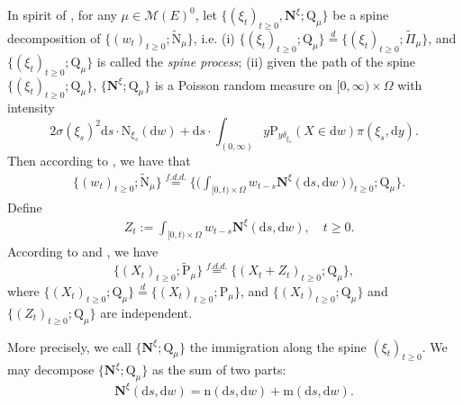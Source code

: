 \documentclass[12pt,a4paper]{amsart}
\numberwithin{equation}{section}
\theoremstyle{plain}
\theoremstyle{definition}
\theoremstyle{remark}
\begin{document}
In spirit of \cite{RenSongSun2020Spine}, for any $\mu\in \mathcal M(E)^0$, let
$\{(\xi_t)_{t\geq 0}, \mathbf N^\xi; \mathrm Q_\mu\}$ be a spine decomposition of $\{(w_t)_{t\geq 0}; \widetilde {\mathrm N}_\mu\}$, i.e.
(i) $\{(\xi_t)_{t\geq 0}; \mathrm Q_\mu\} \overset{d}= \{(\xi_t)_{t\geq 0}; \widetilde \Pi_{\mu} \}$, and $\{(\xi_t)_{t\geq 0}; \mathrm Q_\mu\}$ is called the {\it spine process};
(ii) given the path of the spine
$\{(\xi_t)_{t\geq 0}; \mathrm Q_\mu\}$,
$\{\mathbf N^\xi; \mathrm Q_\mu\}$ is a Poisson random measure on $[0,\infty) \times \Omega$ with intensity
$$
2 \sigma(\xi_s)^2 \mathrm ds \cdot \mathrm N_{\xi_s}(\mathrm dw)+ \mathrm ds \cdot \int_{(0,\infty)} y \mathrm P_{y\delta_{\xi_s}}(X\in \mathrm dw) \pi(\xi_s, \mathrm dy).
$$
Then according to \cite{RenSongSun2020Spine}, we have that
\begin{align}
	& \{(w_t)_{t\geq 0}; \widetilde{\mathrm N}_\mu \} \overset{{f.d.d.}} = \Big\{ \Big( \int_{[0,t)\times \Omega} w_{t-s} \mathbf N^\xi(\mathrm ds, \mathrm dw) \Big)_{t\geq 0} ; \mathrm Q_\mu\Big\}.
\end{align}
Define\begin{align}
	& Z_t:= \int_{[0,t)\times \Omega} w_{t-s} \mathbf N^\xi(\mathrm ds, \mathrm dw), \quad t\geq 0.
\end{align}
According to \cite{RenSongSun2020Spine} and \cite{RenSongYang2016Spine},  we have
\begin{equation}\label{spine-decom1}
	\{(X_t)_{t\geq 0}; \widetilde {\mathrm P}_\mu\} \overset{f.d.d.} = \{ (X_t+ Z_t)_{t\geq 0}; \mathrm Q_\mu\},
\end{equation}
where  $\{(X_t)_{t\geq 0}; \mathrm Q_\mu\} \overset{d} =  \{(X_t)_{t\geq 0}; \mathrm P_\mu\}$,   and $\{(X_t)_{t\geq 0}; \mathrm Q_\mu\} $ and $\{(Z_t)_{t\geq 0}; \mathrm Q_\mu\}$ are independent.

More precisely,
we call $\{\mathbf N^\xi; \mathrm Q_\mu\}$ the immigration along the spine $(\xi_t)_{t\geq 0}$. We may decompose $\{\mathbf N^\xi; \mathrm Q_\mu\}$ as the sum of two parts:
$$
\mathbf N^\xi(\mathrm ds, \mathrm dw)=\mathrm n(\mathrm ds, \mathrm dw)+\mathrm m(\mathrm ds, \mathrm dw).
$$
\end{document}
